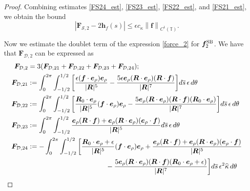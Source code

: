 \documentclass[11pt]{article}
\numberwithin{equation}{section}
\newcommand{\T}{\mathbb{T}}
\newcommand{\bars}{\overline s}
\newcommand{\be}{\bm{e}}
\newcommand{\ts}{\thinspace}
\newcommand{\SB}{{\rm SB}}
\newcommand{\abs}[1]{\left\lvert #1 \right\rvert}
\newcommand{\norm}[1]{\left\lVert #1 \right\rVert}
\newcommand{\wh}[1]{\widehat{#1}}
\newcommand{\mc}[1]{\mathcal{#1}}
\theoremstyle{definition}
\begin{document}
\begin{proof}
Combining estimates \eqref{FS24_est}, \eqref{FS23_est}, \eqref{FS22_est}, and \eqref{FS21_est}, we obtain the bound
\begin{equation}\label{FS2_est}
\abs{\bm{F}_{\mc{S},2}- 2 \bm{h}_f(s)} \le \epsilon c_\kappa \norm{\bm{f}}_{C^1(\T)}.
\end{equation}


Now we estimate the doublet term of the expression \eqref{force_2} for $\bm{f}^{\SB}_2$. We have that $\bm{F}_{\mc{D},2}$ can be expressed as
\begin{equation}\label{FD2}
\begin{aligned}
\bm{F}_{\mc{D},2} &= 3(\bm{F}_{\mc{D},21} + \bm{F}_{\mc{D},22} + \bm{F}_{\mc{D},23}+ \bm{F}_{\mc{D},24}); \\
%
\bm{F}_{\mc{D},21} &:= \int_0^{2\pi}\int_{-1/2}^{1/2} \bigg[\frac{\epsilon({\bm f}\cdot\be_\rho)\be_\rho}{|\bm{R}|^5} - \frac{5\epsilon\be_\rho(\bm{R}\cdot\be_{\rho})(\bm{R}\cdot\bm{f})}{|\bm{R}|^7} \bigg] d\bars \ts \epsilon \ts d\theta \\
%
\bm{F}_{\mc{D},22} &:= \int_0^{2\pi}\int_{-1/2}^{1/2} \bigg[\frac{\bm{R}_0\cdot\be_{\rho}}{|\bm{R}|^5}({\bm f}\cdot\be_\rho)\be_\rho -\frac{5\be_\rho(\bm{R}\cdot\be_{\rho})(\bm{R}\cdot\bm{f})(\bm{R}_0\cdot\be_{\rho})}{|\bm{R}|^7}\bigg] d\bars \ts \epsilon \ts d\theta \\
%
\bm{F}_{\mc{D},23} &:= \int_0^{2\pi}\int_{-1/2}^{1/2} \frac{\be_{\rho}(\bm{R}\cdot\bm{f})+\be_\rho(\bm{R}\cdot\be_{\rho})(\be_{\rho}\cdot\bm{f})}{|\bm{R}|^5} d\bars \ts \epsilon \ts d\theta \\
%
\bm{F}_{\mc{D},24} &:= -\int_0^{2\pi}\int_{-1/2}^{1/2} \bigg[\frac{\bm{R}_0\cdot\be_{\rho}+\epsilon}{|\bm{R}|^5}({\bm f}\cdot\be_\rho)\be_\rho + \frac{\be_{\rho}(\bm{R}\cdot\bm{f})+\be_\rho(\bm{R}\cdot\be_{\rho})(\be_{\rho}\cdot\bm{f})}{|\bm{R}|^5} \\
&\hspace{4cm} -\frac{5\be_\rho(\bm{R}\cdot\be_{\rho})(\bm{R}\cdot\bm{f})(\bm{R}_0\cdot\be_{\rho}+\epsilon)}{|\bm{R}|^7}\bigg] d\bars \ts\epsilon^2\wh\kappa \ts d\theta 
\end{aligned}
\end{equation}


\end{proof}
\end{document}
